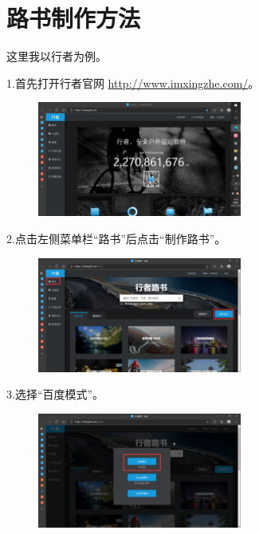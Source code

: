 \documentclass{ctexbook}
\begin{document}
\section{路书制作方法}
\label{chapter：路书制作方法}
这里我以行者为例。

1.首先打开行者官网 \href{http://www.imxingzhe.com/}{http://www.imxingzhe.com/}。

        \begin{figure}[H]
            \begin{center}
            \includegraphics[width=0.6\textwidth]{fig/行者1}
            \end{center}
        \end{figure}

2.点击左侧菜单栏“路书”后点击“制作路书”。
       \begin{figure}[H]
            \begin{center}
            \includegraphics[width=0.6\textwidth]{fig/行者2}
            \end{center}
        \end{figure}

3.选择“百度模式”。
       \begin{figure}[H]
            \begin{center}
            \includegraphics[width=0.6\textwidth]{fig/行者3}
            \end{center}
        \end{figure}
\end{document}
